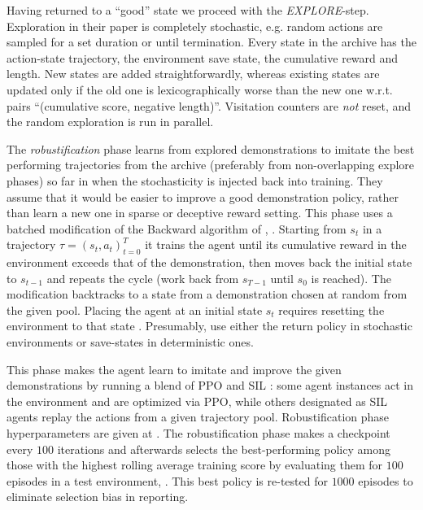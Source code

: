 \documentclass[acmsmall, nonacm]{acmart}
\begin{document}
Having returned to a ``good'' state we proceed with the \emph{EXPLORE}-step.
%
Exploration in their paper is completely stochastic, e.g. random actions are sampled
for a set duration or until termination. Every state in the archive has the action-state
trajectory, the environment save state, the cumulative reward and length. New states
are added straightforwardly, whereas existing states are updated only if the old one
is lexicographically worse than the new one w.r.t. pairs ``(cumulative score, negative
length)''. Visitation counters are \emph{not} reset, and the random exploration is run in parallel.

The \emph{robustification} phase learns from explored demonstrations to imitate the best
performing trajectories from the archive (preferably from non-overlapping explore phases)
so far in when the stochasticity is injected back into training. They assume that it would
be easier to improve a good demonstration policy, rather than learn a new one in sparse
or deceptive reward setting.
% 
%
This phase uses a batched modification of the Backward algorithm of \citet{salimans_learning_2018},
\citep[app.~A.7]{ecoffet_go-explore_2021}.
%
Starting from $s_t$ in a trajectory $\tau = (s_t, a_t)_{t=0}^T$ it trains the agent until
its cumulative reward in the environment exceeds that of the demonstration, then moves back
the initial state to $s_{t-1}$ and repeats the cycle (work back from $s_{T-1}$ until $s_0$
is reached). The modification backtracks to a state from a demonstration chosen at random
from the given pool.
Placing the agent at an initial state $s_t$ requires resetting the environment to that state
\citep[L.~28 of alg.~1]{salimans_learning_2018}. Presumably, \citep{ecoffet_first_2021} use
either the return policy in stochastic environments or save-states in deterministic ones.

This phase makes the agent learn to imitate and improve the given demonstrations by running
a blend of PPO \citep{schulman_proximal_2017} and SIL \citep{oh_self-imitation_2018}: some
agent instances act in the environment and are optimized via PPO, while others designated
as SIL agents replay the actions from a given trajectory pool. Robustification phase
hyperparameters are given at \citep[p.~30]{ecoffet_first_2021}.
%
%
The robustification phase makes a checkpoint every $100$ iterations and afterwards selects
the best-performing policy among those with the highest rolling average training score
by evaluating them for $100$ episodes in a test environment, \citep{ecoffet_first_2021}.
This best policy is re-tested for $1000$ episodes to eliminate selection bias in reporting.
\end{document}

